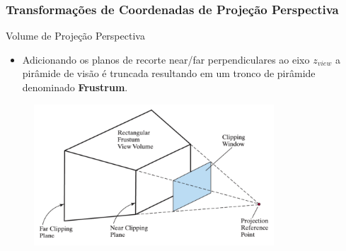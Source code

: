 \documentclass{beamer}
\begin{document}
\begin{frame}
\frametitle{Transformações de Coordenadas de Projeção Perspectiva}
	\begin{block}{Volume de Projeção Perspectiva}
		\begin{itemize}
			\item Adicionando os planos de recorte near/far perpendiculares ao eixo $z_{view}$ a pirâmide de visão é truncada resultando em um tronco de pirâmide denominado \textbf{Frustrum}.
		\end{itemize}	
	\end{block}
	
		\begin{figure}[!h]
			\begin{center}
			\includegraphics[width=0.8\textwidth]{Figures/Fru}
			\end{center}
	\end{figure}
\end{frame}
\end{document}
